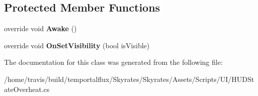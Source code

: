 \subsection*{Protected Member Functions}
\begin{DoxyCompactItemize}
\item 
\hypertarget{class_skyrates_1_1_u_i_1_1_h_u_d_state_overheat_ae562a92ee9c8d8ecd4ffe3ff6722249c}{override void {\bfseries Awake} ()}\label{class_skyrates_1_1_u_i_1_1_h_u_d_state_overheat_ae562a92ee9c8d8ecd4ffe3ff6722249c}

\item 
\hypertarget{class_skyrates_1_1_u_i_1_1_h_u_d_state_overheat_a304c0b10de53cf96fbb383fb554b43ba}{override void {\bfseries On\-Set\-Visibility} (bool is\-Visible)}\label{class_skyrates_1_1_u_i_1_1_h_u_d_state_overheat_a304c0b10de53cf96fbb383fb554b43ba}

\end{DoxyCompactItemize}


The documentation for this class was generated from the following file\-:\begin{DoxyCompactItemize}
\item 
/home/travis/build/temportalflux/\-Skyrates/\-Skyrates/\-Assets/\-Scripts/\-U\-I/H\-U\-D\-State\-Overheat.\-cs\end{DoxyCompactItemize}
